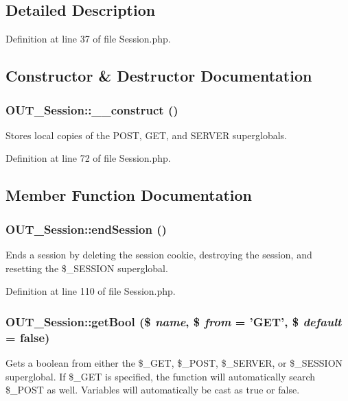 \subsection{Detailed Description}


Definition at line 37 of file Session.php.

\subsection{Constructor \& Destructor Documentation}
\hypertarget{classOUT__Session_a838ed9477ab542064af677e5cf97f276}{
\subsubsection[{\_\-\_\-construct}]{\setlength{\rightskip}{0pt plus 5cm}OUT\_\-Session::\_\-\_\-construct ()}}
\label{d6/d75/classOUT__Session_a838ed9477ab542064af677e5cf97f276}
Stores local copies of the POST, GET, and SERVER superglobals. 

Definition at line 72 of file Session.php.

\subsection{Member Function Documentation}
\hypertarget{classOUT__Session_a249eb4ce8b2f736a2282f9edf48c57fd}{
\subsubsection[{endSession}]{\setlength{\rightskip}{0pt plus 5cm}OUT\_\-Session::endSession ()}}
\label{d6/d75/classOUT__Session_a249eb4ce8b2f736a2282f9edf48c57fd}
Ends a session by deleting the session cookie, destroying the session, and resetting the \$\_\-SESSION superglobal. 

Definition at line 110 of file Session.php.\hypertarget{classOUT__Session_a2000b816710ab8938ff33c21c05ff23e}{
\subsubsection[{getBool}]{\setlength{\rightskip}{0pt plus 5cm}OUT\_\-Session::getBool (\$ {\em name}, \/  \$ {\em from} = {\ttfamily 'GET'}, \/  \$ {\em default} = {\ttfamily false})}}
\label{d6/d75/classOUT__Session_a2000b816710ab8938ff33c21c05ff23e}
Gets a boolean from either the \$\_\-GET, \$\_\-POST, \$\_\-SERVER, or \$\_\-SESSION superglobal. If \$\_\-GET is specified, the function will automatically search \$\_\-POST as well. Variables will automatically be cast as true or false.


